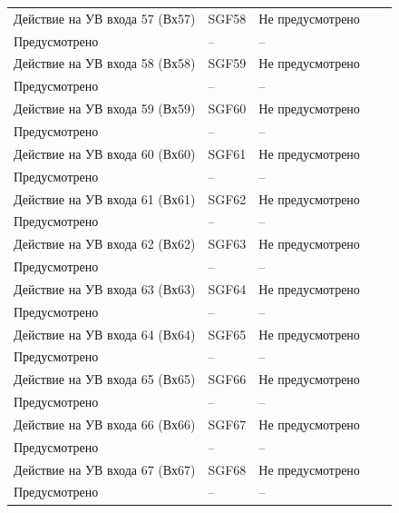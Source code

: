 \begin{longtable}{|>{\centering\arraybackslash}m{5.3cm}|>{\centering\arraybackslash}m{3.3cm}|>{\centering\arraybackslash}m{4.2cm}|>{\centering\arraybackslash}m{1.8cm}|>{\centering\arraybackslash}m{1cm}|}
\hline
\centering Действие на УВ входа 57 (Вх57)  & \centering SGF58 & \centering Не предусмотрено \\ Предусмотрено & \centering -- & \centering \arraybackslash -- \\
\hline
\centering Действие на УВ входа 58 (Вх58)  & \centering SGF59 & \centering Не предусмотрено \\ Предусмотрено & \centering -- & \centering \arraybackslash -- \\
\hline
\centering Действие на УВ входа 59 (Вх59)  & \centering SGF60 & \centering Не предусмотрено \\ Предусмотрено & \centering -- & \centering \arraybackslash -- \\
\hline
\centering Действие на УВ входа 60 (Вх60)  & \centering SGF61 & \centering Не предусмотрено \\ Предусмотрено & \centering -- & \centering \arraybackslash -- \\
\hline
\centering Действие на УВ входа 61 (Вх61)  & \centering SGF62 & \centering Не предусмотрено \\ Предусмотрено & \centering -- & \centering \arraybackslash -- \\
\hline
\centering Действие на УВ входа 62 (Вх62)  & \centering SGF63 & \centering Не предусмотрено \\ Предусмотрено & \centering -- & \centering \arraybackslash -- \\
\hline
\centering Действие на УВ входа 63 (Вх63)  & \centering SGF64 & \centering Не предусмотрено \\ Предусмотрено & \centering -- & \centering \arraybackslash -- \\
\hline
\centering Действие на УВ входа 64 (Вх64)  & \centering SGF65 & \centering Не предусмотрено \\ Предусмотрено & \centering -- & \centering \arraybackslash -- \\
\hline
\centering Действие на УВ входа 65 (Вх65)  & \centering SGF66 & \centering Не предусмотрено \\ Предусмотрено & \centering -- & \centering \arraybackslash -- \\
\hline
\centering Действие на УВ входа 66 (Вх66)  & \centering SGF67 & \centering Не предусмотрено \\ Предусмотрено & \centering -- & \centering \arraybackslash -- \\
\hline
\centering Действие на УВ входа 67 (Вх67)  & \centering SGF68 & \centering Не предусмотрено \\ Предусмотрено & \centering -- & \centering \arraybackslash -- \\

\end{longtable}
